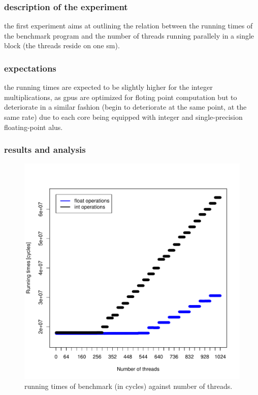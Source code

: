 \documentclass{report}
\def \scalingfactor{.8}
\begin{document}
	\subsubsection{description of the experiment}
	the first experiment aims at outlining the relation between the running
    times of the benchmark program and the number of threads running parallely in
    a single block (the threads reside on one sm).
	\subsubsection{expectations}
    the running times are expected to be slightly higher for the integer
    multiplications, as gpus are optimized for floting point computation
    but to deteriorate in a similar fashion (begin to deteriorate
    at the same point, at the same rate) due to each core being equipped with
    integer and single-precision floating-point alus.
    
	\subsubsection{results and analysis}
    \begin{figure}[h]
    	\centering
		\vspace{-20pt}
	    \includegraphics[width=\scalingfactor\linewidth]{"graphics/float_vs_int_running_times"}
		\vspace{-15pt}
		\captionsetup{justification=centering}
        \caption{running times of benchmark (in cycles) against number of threads.}
    \end{figure}
	
\end{document}
